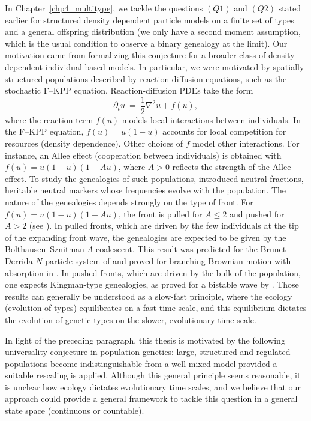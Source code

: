 In Chapter~\ref{chp4_multitype}, we tackle the questions $(Q1)$ and $(Q2)$ stated earlier for structured density dependent particle models on a finite set of types and a general offspring distribution (we only have a second moment assumption, which is the usual condition to observe a binary genealogy at the limit).
Our motivation came from formalizing this conjecture for a broader class of density-dependent individual-based models. In particular, we were motivated by spatially structured populations described by reaction-diffusion equations, such as the stochastic F--KPP equation. Reaction-diffusion PDEs take the form
\[
\partial_t u \ =\ \frac{1}{2}\nabla^2 u + f(u),
\]
where the reaction term $f(u)$ models local interactions between individuals. In the F--KPP equation, $f(u)=u(1-u)$ accounts for local competition for resources (density dependence). Other choices of $f$ model other interactions. For instance, an Allee effect (cooperation between individuals) is obtained with $f(u)=u(1-u)(1+Au)$, where $A>0$ reflects the strength of the Allee effect.
To study the genealogies of such populations, \cite{hallatschek_gene_2008} introduced neutral fractions, \ie heritable neutral markers whose frequencies evolve with the population. The nature of the genealogies depends strongly on the type of front.
 For $f(u)=u(1-u)(1+Au)$, the front is pulled for $A\le 2$ and pushed for $A>2$ (see \cite{birzu_fluctuations_2018}). In pulled fronts, which are driven by the few individuals at the tip of the expanding front wave, the genealogies are expected to be given by the Bolthausen--Sznitman $\Lambda$-coalescent. This result was predicted for the Brunet--Derrida $N$-particle system of \cite{brunet_effect_2007} and proved for branching Brownian motion with absorption in \cite{berestycki_genealogy_2013}. 
In pushed fronts, which are driven by the bulk of the population, one expects Kingman-type genealogies, as proved for a bistable wave by \cite{etheridge_genealogies_2022}.
Those results can generally be understood as a slow-fast principle, where the ecology (evolution of types) equilibrates on a fast time scale, and this equilibrium dictates the evolution of genetic types on the slower, evolutionary time scale. 


In light of the preceding paragraph, this thesis is motivated by the following universality conjecture in population genetics: large, structured and regulated populations become indistinguishable from a well-mixed model provided a suitable rescaling is applied. 
Although this general principle seems reasonable, it is unclear how ecology dictates evolutionary time scales, and we believe that our approach could  provide a general framework  to tackle this question in a general state space (continuous or countable). 


